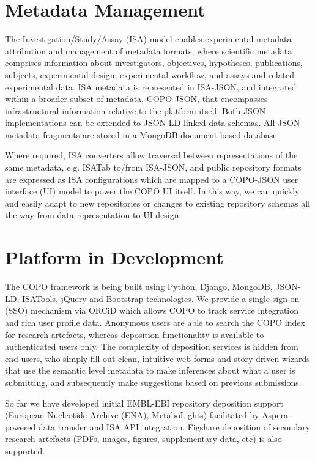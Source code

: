 \documentclass[runningheads,a4paper]{llncs}
\begin{document}
\vspace*{-0.3in}
\section{Metadata Management}
\vspace*{-0.1in}
The Investigation/Study/Assay (ISA) model enables experimental
metadata attribution and management of metadata formats, where
scientific metadata comprises information about investigators,
objectives, hypotheses, publications, subjects, experimental design,
experimental workflow, and assays and related experimental data. ISA
metadata is represented in ISA-JSON, and integrated within a broader
subset of metadata, COPO-JSON, that encompasses infrastructural
information relative to the platform itself. Both JSON implementations
can be extended to JSON-LD linked data schemas. All JSON metadata
fragments are stored in a MongoDB document-based database.

Where required, ISA converters allow traversal between representations
of the same metadata, e.g. ISATab to/from ISA-JSON, and public
repository formats are expressed as ISA configurations which are
mapped to a COPO-JSON user interface (UI) model to power the COPO UI
itself. In this way, we can quickly and easily adapt to new
repositories or changes to existing repository schemas all the way
from data representation to UI design.

\vspace*{-0.1in}
\section{Platform in Development}
\vspace*{-0.1in}
The COPO framework is being built using Python, Django, MongoDB,
JSON-LD, ISATools, jQuery and Bootstrap technologies. We provide a
single sign-on (SSO) mechanism via ORCiD which allows COPO to track
service integration and rich user profile data. Anonymous users are
able to search the COPO index for research artefacts, whereas
deposition functionality is available to authenticated users only. The
complexity of deposition services is hidden from end users, who simply
fill out clean, intuitive web forms and story-driven wizards that use
the semantic level metadata to make inferences about what a user is
submitting, and subsequently make suggestions based on previous
submissions.

So far we have developed initial EMBL-EBI repository deposition
support (European Nucleotide Archive (ENA), MetaboLights) facilitated
by Aspera-powered data transfer and ISA API integration. Figshare
deposition of secondary research artefacts (PDFs, images, figures,
supplementary data, etc) is also supported.
\end{document}

